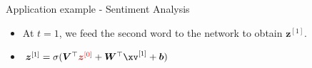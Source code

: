 \documentclass[11pt,compress,t,notes=noshow]{beamer}
\begin{document}
\begin{frame} {Application example - Sentiment Analysis}
  \begin{itemize}
    \item At $t = 1$, we feed the second word to the network to obtain $\bm{z}^{[1]}$.
    \item $\bm{z}^{[1]} = \sigma(\bm{V}^\top\textcolor{red}{\bm{z}^{[0]}} + \bm{W}^\top \xv^{[1]} + \bm{b})$
  \end{itemize}
  \begin{figure}
      \centering
  \end{figure}
\end{frame}
\end{document}

